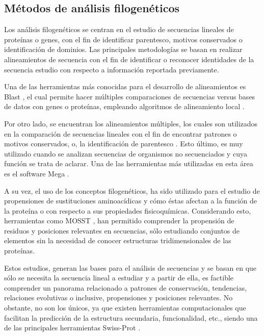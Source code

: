 \subsection{Métodos de análisis filogenéticos} 

Los análisis filogenéticos se centran en el estudio de secuencias lineales de proteínas o genes, con el fin de identificar parentesco, motivos conservados o identificación de dominios. Las principales metodologías se basan en realizar alineamientos de secuencia con el fin de identificar o reconocer identidades de la secuencia estudio con respecto a información reportada previamente. 

Una de las herramientas más conocidas para el desarrollo de alineamientos es Blast \cite{kent2002blat}, el cual permite hacer múltiples comparaciones de secuencias versus bases de datos con genes o proteínas, empleando algoritmos de alineamiento local \cite{altschul1990basic}. 

Por otro lado, se encuentran los alineamientos múltiples, los cuales son utilizados en la comparación de secuencias lineales con el fin de encontrar patrones o motivos conservados, o, la identificación de parentesco \cite{Thompson1997}. Esto último, es muy utilizado cuando se analizan secuencias de organismos no secuenciados y cuya función se trata de aclarar. Una de las herramientas más utilizadas en esta área es el software Mega \cite{mst197}.

A su vez, el uso de los conceptos filogenéticos, ha sido utilizado para el estudio de propensiones de sustituciones aminoacídicas y cómo éstas afectan a la función de la proteína o con respecto a sus propiedades fisicoquímicas. Considerando esto, herramientas como MOSST \cite{Olivera-Nappa2011}, han permitido comprender la propensión de residuos y posiciones relevantes en secuencias, sólo estudiando conjuntos de elementos sin la necesidad de conocer estructuras tridimensionales de las proteínas.

Estos estudios, generan las bases para el análisis de secuencias y se basan en que sólo se necesita la secuencia lineal a estudiar y a partir de ella, es factible comprender un panorama relacionado a patrones de conservación, tendencias, relaciones evolutivas o inclusive, propensiones y posiciones relevantes. No obstante, no son los únicos, ya que existen herramientas computacionales que facilitan la predicción de la estructura secundaria, funcionalidad, etc., siendo una de las principales herramientas Swiss-Prot \cite{boeckmann2003swiss}.


